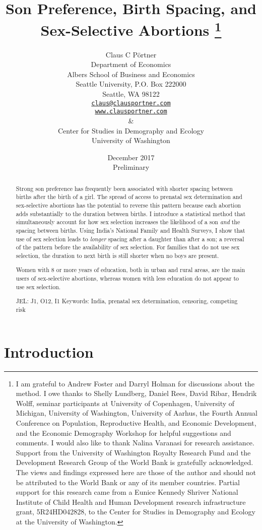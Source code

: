 \documentclass[12pt,letterpaper]{article}
\title{Son Preference, Birth Spacing, and Sex-Selective Abortions%
\protect\thanks{%
I am grateful to Andrew Foster and Darryl Holman for discussions about the method.
I owe thanks to Shelly Lundberg, Daniel Rees, David Ribar, 
Hendrik Wolff, seminar participants at University of Copenhagen, University of Michigan, 
University of Washington, University of Aarhus, the Fourth 
Annual Conference on Population, Reproductive Health, 
and Economic Development, and the Economic Demography Workshop for helpful suggestions and comments.
I would also like to thank Nalina Varanasi for research assistance.
Support from the University of Washington Royalty Research Fund and the 
Development Research Group of the World Bank is gratefully acknowledged.
The views and findings expressed here are those of the author and
should not be attributed to the World Bank or any of its member countries.
Partial support for this research came from a Eunice Kennedy Shriver National
Institute of Child Health and Human Development research infrastructure grant,
5R24HD042828, to the Center for Studies in Demography and Ecology at the
University of Washington.
}
}
\author{}
\author{Claus C P\"ortner\\
    Department of Economics\\
    Albers School of Business and Economics\\
    Seattle University, P.O. Box 222000\\
    Seattle, WA 98122\\
    \href{mailto:claus@clausportner.com}{\texttt{claus@clausportner.com}}\\
    \href{http://www.clausportner.com}{\texttt{www.clausportner.com}}\\
    \& \\
    Center for Studies in Demography and Ecology \\
    University of Washington\\ \vspace{2cm}
    }
\date{December 2017\\
\bigskip
Preliminary}
\begin{document}
\graphicspath{{../figures/}}

\setcounter{page}{-1}
\maketitle
\thispagestyle{empty}



\newpage
\thispagestyle{empty}
\doublespacing

\begin{abstract}

\noindent 

Strong son preference has frequently been associated with shorter 
spacing between births after the birth of a girl.
The spread of access to prenatal sex determination and 
sex-selective abortions has the potential to reverse this pattern
because each abortion adds substantially to the duration between births.
I introduce a statistical method that simultaneously account for how sex 
selection increases the likelihood of a son \emph{and} the spacing between births.
Using India's National Family and Health Surveys,
I show that use of sex selection leads to \emph{longer} spacing after a daughter 
than after a son; a reversal of the pattern before the availability of sex selection.
For families that do not use sex selection, the duration to next birth is still 
shorter when no boys are present.

Women with 8 or more years of education, both in urban and rural areas, are 
the main users of sex-selective abortions, whereas women with less education 
do not appear to use sex selection.


\noindent JEL: J1, O12, I1
\noindent Keywords: India, prenatal sex determination, censoring, competing risk
\end{abstract}

\newpage



\section{Introduction\label{sec:intro}}
\end{document}
